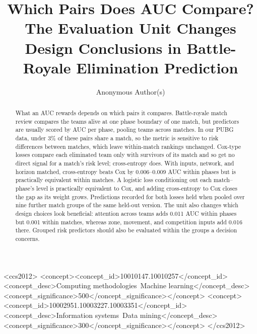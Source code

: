 \documentclass[sigconf,anonymous]{acmart}
\begin{document}
\title{Which Pairs Does AUC Compare? The Evaluation Unit Changes Design Conclusions in Battle-Royale Elimination Prediction}
\renewcommand{\shorttitle}{Which Pairs Does AUC Compare?}

\author{Anonymous Author(s)}

\begin{abstract}
What an AUC rewards depends on which pairs it compares. Battle-royale match review compares the teams alive at one phase boundary of one match, but predictors are usually scored by AUC per phase, pooling teams across matches. In our PUBG data, under 3\% of these pairs share a match, so the metric is sensitive to risk differences between matches, which leave within-match rankings unchanged. Cox-type losses compare each eliminated team only with survivors of its match and so get no direct signal for a match's risk level; cross-entropy does. With inputs, network, and horizon matched, cross-entropy beats Cox by 0.006--0.009 AUC within phases but is practically equivalent within matches. A logistic loss conditioning out each match--phase's level is practically equivalent to Cox, and adding cross-entropy to Cox closes the gap as its weight grows. Predictions recorded for both losses held when pooled over nine further match groups of the same held-out version. The unit also changes which design choices look beneficial: attention across teams adds 0.011 AUC within phases but 0.001 within matches, whereas zone, movement, and competition inputs add 0.016 there. Grouped risk predictors should also be evaluated within the groups a decision concerns.
\end{abstract}
\begin{CCSXML}
<ccs2012>
<concept><concept_id>10010147.10010257</concept_id><concept_desc>Computing methodologies~Machine learning</concept_desc><concept_significance>500</concept_significance></concept>
<concept><concept_id>10002951.10003227.10003351</concept_id><concept_desc>Information systems~Data mining</concept_desc><concept_significance>300</concept_significance></concept>
</ccs2012>
\end{CCSXML}
\maketitle
\end{document}
